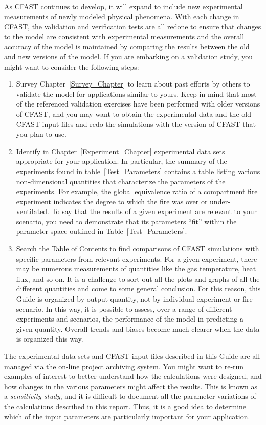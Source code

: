 As CFAST continues to develop, it will expand to include new experimental measurements of newly modeled physical phenomena. With each change in CFAST, the validation and verification tests are all redone to ensure that changes to the model are consistent with experimental measurements and the overall accuracy of the model is maintained by comparing the results between the old and new versions of the model. If you are embarking on a validation study, you might want to consider the following steps:
\begin{enumerate}
\item Survey Chapter~\ref{Survey_Chapter} to learn about past efforts by others to validate the model for applications similar to yours. Keep in mind that most of the referenced validation exercises have been performed with older versions of CFAST, and you may want to obtain the experimental data and the old CFAST input files and redo the simulations with the version of CFAST that you plan to use.
\item Identify in Chapter~\ref{Experiment_Chapter} experimental data sets appropriate for your application. In particular, the summary of the experiments found in table~\ref{Test_Parameters} contains a table listing various non-dimensional quantities that characterize the parameters of the experiments. For example, the global equivalence ratio of a compartment fire experiment indicates the degree to which the fire was over or under-ventilated. To say that the results of a given experiment are relevant to your scenario, you need to demonstrate that its parameters ``fit'' within the parameter space outlined in Table~\ref{Test_Parameters}.
\item Search the Table of Contents to find comparisons of CFAST simulations with specific parameters from relevant experiments. For a given experiment, there may be numerous measurements of quantities like the gas temperature, heat flux, and so on. It is a challenge to sort out all the plots and graphs of all the different quantities and come to some general conclusion. For this reason, this Guide is organized by output quantity, not by individual experiment or fire scenario. In this way, it is possible to assess, over a range of different experiments and scenarios, the performance of the model in predicting a given quantity. Overall trends and biases become much clearer when the data is organized this way.
\end{enumerate}
The experimental data sets and CFAST input files described in this Guide are all managed via the on-line project archiving system. You might want to re-run examples of interest to better understand how the calculations were designed, and how changes in the various parameters might affect the results. This is known as a {\em sensitivity study}, and it is difficult to document all the parameter variations of the calculations described in this report. Thus, it is a good idea to determine which of the input parameters are particularly important for your application.






